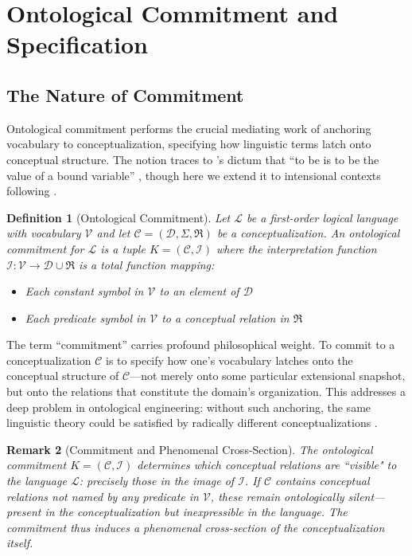 \documentclass[12pt,a4paper]{article}
\newtheorem{definition}{Definition}[section]
\newtheorem{remark}[definition]{Remark}
\newcommand{\domain}{\mathcal{D}}
\newcommand{\vocab}{\mathcal{V}}
\newcommand{\lang}{\mathcal{L}}
\newcommand{\interp}{\mathcal{I}}
\newcommand{\concept}{\mathcal{C}}
\newcommand{\intrel}{\mathfrak{R}}
\begin{document}
\section{Ontological Commitment and Specification}

\subsection{The Nature of Commitment}

Ontological commitment performs the crucial mediating work of anchoring vocabulary to conceptualization, specifying how linguistic terms latch onto conceptual structure. The notion traces to \citeauthor{quine1948}'s dictum that ``to be is to be the value of a bound variable'' \citep{quine1948}, though here we extend it to intensional contexts following \citet{guarino1998}.

\begin{definition}[Ontological Commitment]
Let $\lang$ be a first-order logical language with vocabulary $\vocab$ and let $\concept = (\domain, \Sigma, \intrel)$ be a conceptualization. An \emph{ontological commitment} for $\lang$ is a tuple $K = (\concept, \interp)$ where the \emph{interpretation function} $\interp : \vocab \to \domain \cup \intrel$ is a total function mapping:
\begin{itemize}
    \item Each constant symbol in $\vocab$ to an element of $\domain$
    \item Each predicate symbol in $\vocab$ to a conceptual relation in $\intrel$
\end{itemize}
\end{definition}

The term ``commitment'' carries profound philosophical weight. To commit to a conceptualization $\concept$ is to specify how one's vocabulary latches onto the conceptual structure of $\concept$---not merely onto some particular extensional snapshot, but onto the relations that constitute the domain's organization. This addresses a deep problem in ontological engineering: without such anchoring, the same linguistic theory could be satisfied by radically different conceptualizations \citep{guarino2009}.

\begin{remark}[Commitment and Phenomenal Cross-Section]
The ontological commitment $K = (\concept, \interp)$ determines which conceptual relations are ``visible" to the language $\lang$: precisely those in the image of $\interp$. If $\concept$ contains conceptual relations not named by any predicate in $\vocab$, these remain ontologically silent---present in the conceptualization but inexpressible in the language. The commitment thus induces a phenomenal cross-section of the conceptualization itself.
\end{remark}
\end{document}
